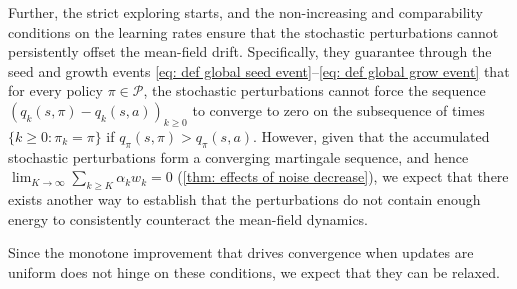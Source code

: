 Further, the strict exploring starts, and the non-increasing and comparability conditions on the learning rates ensure that the stochastic perturbations cannot persistently offset the mean-field drift.
Specifically, they guarantee through the seed and growth events \eqref{eq: def global seed event}--\eqref{eq: def global grow event} that
for every policy $\pi \in \mathcal P$,
the stochastic perturbations cannot force the sequence
$(q_k(s,\pi) - q_k(s,a))_{k \ge 0}$ to converge to zero 
on the subsequence of times $\{k \ge 0 : \pi_k = \pi\}$
if $q_{\pi}(s,\pi) > q_{\pi}(s,a)$.
However, given that the accumulated stochastic perturbations form a converging martingale sequence, and hence $\lim_{K \to \infty} \sum_{k \ge K} \alpha_k w_k = 0$ (\autoref{thm: effects of noise decrease}), we expect that there exists another way to establish that the perturbations do not contain enough energy to consistently counteract the mean-field dynamics.



Since the monotone improvement that drives convergence when updates are uniform does not hinge on these conditions, we expect that they can be relaxed.

